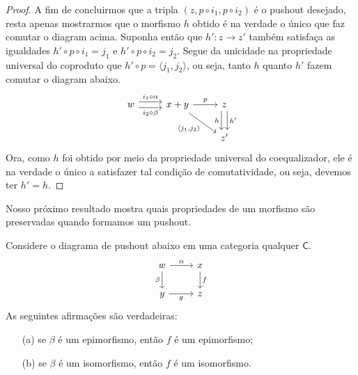 \begin{proof}
    A fim de concluirmos que a tripla $(z,p \circ i_1, p \circ i_2)$ é o pushout desejado, resta apenas mostrarmos que o morfismo $h$ obtido é na verdade o único que faz comutar o diagram acima.
    Suponha então que $h': z \to z'$ também satisfaça as igualdades $h' \circ p \circ i_1 = j_1$ e $h' \circ p \circ i_2 = j_2$.
    Segue da unicidade na propriedade universal do coproduto que $h' \circ p = \langle j_1,j_2 \rangle$, ou seja, tanto $h$ quanto $h'$ fazem comutar o diagram abaixo.
     \begin{displaymath}
        \begin{tikzcd}
            w
            \arrow[r, shift left=1.25, "i_1 \circ \alpha"]
            \arrow[r, shift right=1.25, "i_2 \circ \beta" swap]
            & x+y
            \arrow[r, "p"]
            \arrow[rd, "{\langle j_1,j_2 \rangle}" swap]
            & z
            \arrow[d, shift right=1.25, "h" swap]
            \arrow[d, shift left=1.25, "h'"]
            \\ & & z'
        \end{tikzcd}
      \end{displaymath}
      Ora, como $h$ foi obtido por meio da propriedade universal do coequalizador, ele é na verdade o único a satisfazer tal condição de comutatividade, ou seja, devemos ter $h'= h$.
\end{proof}

Nosso próximo resultado mostra quais propriedades de um morfismo são preservadas quando formamos um pushout.

\begin{teo}\label{teo:props_preservadas_pushout}
    Considere o diagrama de pushout abaixo em uma categoria qualquer $\mathsf{C}$.
    \begin{displaymath}
        \begin{tikzcd}
            w
            \arrow[r, "\alpha"]
            \arrow[d, "\beta" swap]
            & x
            \arrow[d, "f"]
            \\ y
            \arrow[r, "g" swap]
            & z
        \end{tikzcd}
    \end{displaymath}
    As seguintes afirmações são verdadeiras:
    \begin{enumerate}
        \item[(a)] se $\beta$ é um epimorfismo, então $f$ é um epimorfismo;

        \item[(b)] se $\beta$ é um isomorfismo, então $f$ é um isomorfismo.
    \end{enumerate}
\end{teo}

